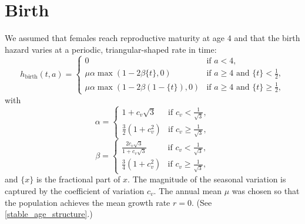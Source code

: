 \documentclass[12pt]{article}
\begin{document}
\section{Birth}

We assumed that females reach reproductive maturity at age $4$ and
that the birth hazard varies at a periodic, triangular-shaped rate in
time:
\begin{equation}
  h_{\text{birth}}(t, a) =
  \begin{cases}
    0 & \text{if $a < 4$},
    \\
    \mu \alpha \max\left(1 - 2 \beta \{t\}, 0\right)
    & \text{if $a \geq 4$ and $\{t\} < \frac{1}{2}$},
    \\
    \mu \alpha \max\left(1 - 2 \beta (1 - \{t\}), 0\right)
    & \text{if $a \geq 4$ and $\{t\} \geq \frac{1}{2}$},
  \end{cases}
\end{equation}
with
\begin{equation}
  \alpha =
  \begin{cases}
    1 + c_v \sqrt{3}
    & \text{if $c_v < \frac{1}{\sqrt{3}}$},
    \\
    \frac{3}{2} \left(1 + c_v^2\right)
    & \text{if $c_v \geq \frac{1}{\sqrt{3}}$},
  \end{cases}
\end{equation}
\begin{equation}
  \beta =
  \begin{cases}
    \frac{2 c_v \sqrt{3}}{1 + c_v \sqrt{3}}
    & \text{if $c_v < \frac{1}{\sqrt{3}}$},
    \\
    \frac{3}{4} \left(1 + c_v^2\right)
    & \text{if $c_v \geq \frac{1}{\sqrt{3}}$},
  \end{cases}
\end{equation}
and $\{x\}$ is the fractional part of $x$.  The magnitude of the
seasonal variation is captured by the coefficient of variation $c_v$.
The annual mean $\mu$ was chosen so that the population achieves the
mean growth rate $r = 0$.  (See \autoref{stable_age_structure}.)
\end{document}

